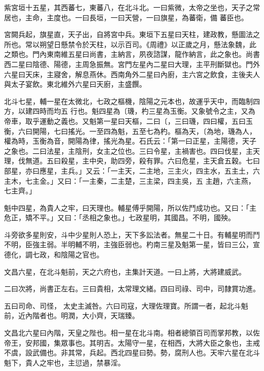 \begin{pinyinscope}
 紫宮垣十五星，其西蕃七，東蕃八，在北斗北。一曰紫微，太帝之坐也，天子之常居也，主命，主度也。一曰長垣，一曰天營，一曰旗星，為蕃衛，備
 蕃臣也。



 宮闕兵起，旗星直，天子出，自將宮中兵。東垣下五星曰天柱，建政教，懸圖法之所也。常以朔望日懸禁令於天柱，以示百司。《周禮》以正歲之月，懸法象魏，此之類也。門內東南維五星曰尚書，主納言，夙夜諮謀，龍作納言，此之象也。尚書西二星曰陰德、陽德，主周急振無。宮門左星內二星曰大理，主平刑斷獄也。門外六星曰天床，主寢舍，解息燕休。西南角外二星曰內廚，主六宮之飲食，主後夫人與太子宴飲。東北維外六星曰天廚，主盛饌。



 北斗七星，輔一星在太微北，七政之樞機，陰陽之元本也，故運乎天中，而臨制四方，以建四時而均五
 行也。魁四星為〔璣，杓三星為玉衡。又象號令之主，又為帝車，取乎運動之義也。又魁第一星曰天樞，二曰〔，三曰璣，四曰權，五曰玉衡，六曰開陽，七曰搖光。一至四為魁，五至七為杓。樞為天，〔為地，璣為人，權為時，玉衡為音，開陽為律，搖光為星。石氏云：「第一曰正星，主陽德，天子之象也。二曰法星，主陰刑，女主之位也。三曰令星，主禍害也。四曰伐星，主天理，伐無道。五曰殺星，主中央，助四旁，殺有罪。六曰危星，主天倉五穀。七曰部星，亦曰應星，主兵。」又云：「一主天，二主地，三主火，四主水，五主土，六主木，七主金。」又曰：「一主秦，二主楚，三主梁，四主吳，五
 主趙，六主燕，七主齊。」



 魁中四星，為貴人之牢，曰天理也。輔星傅乎開陽，所以佐鬥成功也。又曰：「主危正，矯不平。」又曰：「丞相之象也。」七政星明，其國昌。不明，國殃。



 斗旁欲多星則安，斗中少星則人恐上，天下多訟法者。無星二十日。有輔星明而鬥不明，臣強主弱。半明輔不明，主強臣弱也。杓南三星及魁第一星，皆曰三公，宣德化，調七政，和陰陽之官也。



 文昌六星，在北斗魁前，天之六府也，主集計天道。一曰上將，大將建威武。



 二曰次將，尚書正左右。三曰貴相，太常理文緒。四曰司祿、司中，司隸賞功進。



 五曰司命、司怪，
 太史主滅咎。六曰司寇，大理佐理寶。所謂一者，起北斗魁前，近內階者也。明潤，大小齊，天瑞臻。



 文昌北六星曰內階，天皇之陛也。相一星在北斗南。相者總領百司而掌邦教，以佐帝王，安邦國，集眾事也。其明吉。太陽守一星，在相西，大將大臣之象也，主戒不虞，設武備也。非其常，兵起。西北四星曰勢。勢，腐刑人也。天牢六星在北斗魁下，貴人之牢也，主愆過，禁暴淫。




\end{pinyinscope}
